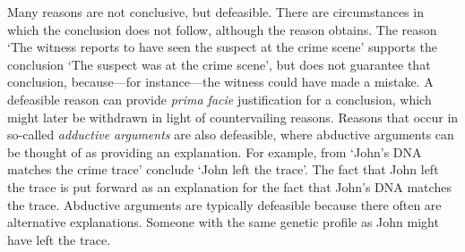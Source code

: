\documentclass[10pt]{article}
\begin{document}
Many reasons are not conclusive, but defeasible. There are circumstances in which the conclusion does not follow, although the reason obtains. The reason `The witness reports to have seen the suspect at the crime scene' supports the conclusion `The suspect was at the crime scene', but does not guarantee that conclusion, because---for instance---the witness could have made a mistake. A defeasible reason can provide \textit{prima facie} justification for a conclusion, which might later be withdrawn in light of  countervailing reasons.
%
%
%
Reasons that occur in so-called \textit{adductive arguments} are also defeasible, where 
abductive arguments can be thought of as providing an explanation. %
For example, from `John's DNA matches the crime trace' conclude `John left the trace'.
The fact that John left the trace is put forward as an explanation for the fact that John's DNA matches the trace. 
Abductive arguments are typically defeasible because there often are alternative explanations. %
Someone with the same genetic profile as John might have left the trace. 

\end{document}
